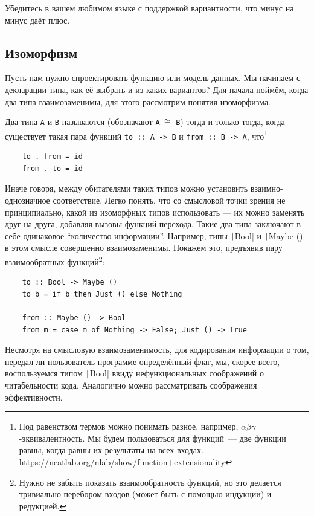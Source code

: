 \begin{task}
    Убедитесь в вашем любимом языке с поддержкой вариантности, что минус на минус даёт плюс.
\end{task}

\subsection{Изоморфизм} \label{subsec:isomorphism}

Пусть нам нужно спроектировать функцию или модель данных.
Мы начинаем с декларации типа, как её выбрать и из каких вариантов?
Для начала поймём, когда два типа взаимозаменимы, для этого рассмотрим понятия изоморфизма.

Два типа \texttt{A} и \texttt{B} называются  (обозначают \texttt{A $\cong$ B}) тогда и только тогда, когда существует такая пара функций \texttt{to :: A -> B} и \texttt{from :: B -> A}, что\footnote{Под равенством термов можно понимать разное, например, $\alpha\beta\gamma$-эквивалентность. Мы будем пользоваться  для функций~--- две функции равны, когда равны их результаты на всех входах. \url{https://ncatlab.org/nlab/show/function+extensionality}}
\begin{verbatim}
    to . from = id
    from . to = id
\end{verbatim}

Иначе говоря, между обитателями таких типов можно установить взаимно-однозначное соответствие.
Легко понять, что со смысловой точки зрения не принципиально, какой из изоморфных типов использовать --- их можно заменять друг на друга, добавляя вызовы функций перехода.
Такие два типа заключают в себе одинаковое ``количество информации''.
Например, типы \texttt|Bool| и \texttt|Maybe ()| в этом смысле совершенно взаимозаменимы.
Покажем это, предъявив пару взаимообратных функций\footnote{Нужно не забыть показать взаимообратность функций, но это делается тривиально перебором входов (может быть с помощью индукции) и редукцией.}:
\begin{verbatim}
    to :: Bool -> Maybe ()
    to b = if b then Just () else Nothing

    from :: Maybe () -> Bool
    from m = case m of Nothing -> False; Just () -> True
\end{verbatim}

Несмотря на смысловую взаимозаменимость, для кодирования информации о том, передал ли пользователь программе определённый флаг, мы, скорее всего, воспользуемся типом \texttt|Bool| ввиду нефункциональных соображений о читабельности кода.
Аналогично можно рассматривать соображения эффективности.

